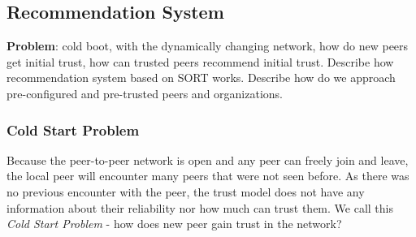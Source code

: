 \subsection{Recommendation System}
\textbf{Problem}: cold boot, with the dynamically changing network, how do new peers get initial trust, how can trusted peers recommend initial trust. Describe how recommendation system based on SORT works. Describe how do we approach pre-configured and pre-trusted peers and organizations.

\subsubsection{Cold Start Problem}
Because the peer-to-peer network is open and any peer can freely join and leave, the local peer will encounter many peers that were not seen before. As there was no previous encounter with the peer, the trust model does not have any information about their reliability nor how much can trust them. 
We call this \textit{Cold Start Problem} - how does new peer gain trust in the network? 

